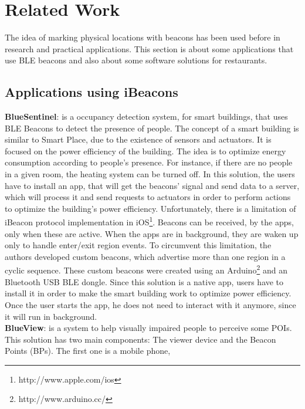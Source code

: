 
\section{Related Work}
\label{sec:related_work}
The idea of marking physical locations with beacons has been used before
in research and practical applications.
This section is about some applications that use BLE beacons and also
about some software solutions for restaurants.

\subsection{Applications using iBeacons}
\label{sub:applications_using_ibeacons}
\textbf{BlueSentinel}\cite{bluesentinel}: is a
occupancy detection system, for smart buildings,
that uses BLE Beacons to detect the presence of
people. The concept of a smart building
is similar to Smart Place,
due to the existence of sensors and actuators.
It is focused on the power efficiency of the
building. The idea is to optimize energy
consumption according to people's presence.
For instance, if there are no people in a given room,
the heating system can be turned off.
In this solution, the users have to install
an app, that will get the beacons' signal and
send data to a server, which will process it
and send requests to actuators in order to
perform actions to optimize the
building's power efficiency.
Unfortunately, there is a limitation
of iBeacon protocol implementation
in iOS\footnote{http://www.apple.com/ios}.
Beacons can be received, by the apps,
only when these are active. When the apps are in
background, they are waken up only to handle
enter/exit region events. To circumvent this
limitation, the authors developed custom
beacons, which advertise more than one region
in a cyclic sequence. These custom beacons
were created using an
Arduino\footnote{http://www.arduino.cc/}
and an Bluetooth USB BLE dongle.
Since this solution is a native app,
users have to install it in order
to make the smart building work to
optimize power efficiency.
Once the user starts the app, he does not
need to interact with it anymore, since it
will run in background.
\\
\textbf{BlueView}\cite{blueview}: is a system to help
visually impaired people to perceive some POIs.
This solution has two main components: The viewer device
and the Beacon Points (BPs). The first one is a mobile phone,
